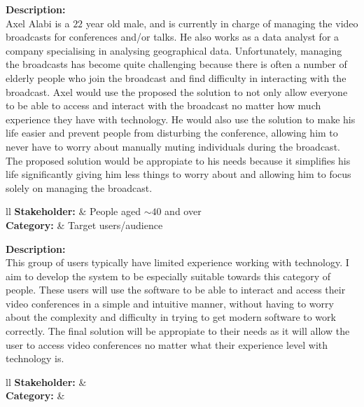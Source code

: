 \textbf{Description:} \\ 

Axel Alabi is a $22$ year old male, and is currently in charge 
of managing the video broadcasts for conferences and/or talks.
He also works as a data analyst for a company specialising in
analysing geographical data. Unfortunately, managing the
broadcasts has become quite challenging because there is
often a number of elderly people who join the broadcast and
find difficulty in interacting with the broadcast. Axel would 
use the proposed the solution to not only allow everyone to be
able to access and interact with the broadcast no matter how 
much experience they have with technology. He would also use 
the solution to make his life easier and prevent people from 
disturbing the conference, allowing him to never have to worry
about manually muting individuals during the broadcast. The 
proposed solution would be appropiate to his needs because it 
simplifies his life significantly giving him less things to 
worry about and allowing him to focus solely on managing the 
broadcast. \vspace{0.2cm}

\noindent
\begin{tblr}{ll}
  \textbf{Stakeholder: } & People aged $\sim 40$ and over\\
  \textbf{Category: } & Target users/audience\\
\end{tblr}
\vspace{0.2cm}

\textbf{Description: } \\

This group of users typically have limited experience working 
with technology. I aim to develop the system to be especially
suitable towards this category of people. These users will use
the software to be able to interact and access their video 
conferences in a simple and intuitive manner, without having 
to worry about the complexity and difficulty in trying to get
modern software to work correctly. The final solution will be
appropiate to their needs as it will allow the user to access
video conferences no matter what their experience level with 
technology is.

\noindent
\begin{tblr}{ll}
  \textbf{Stakeholder: } & \\
  \textbf{Category: } & \\
\end{tblr}
\vspace{0.2cm}

